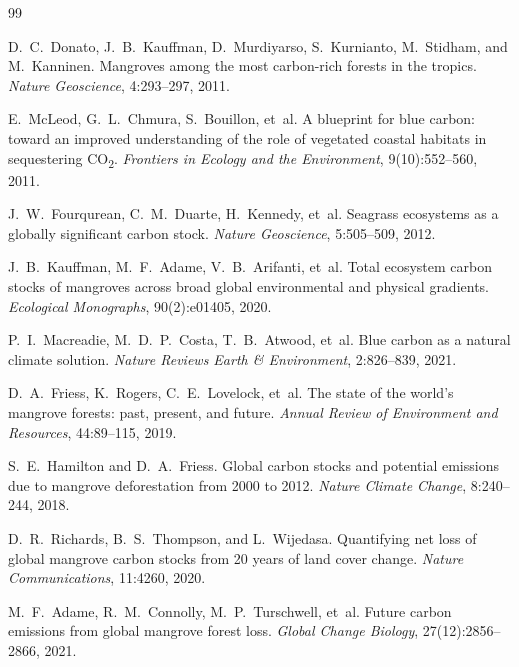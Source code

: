 \documentclass[twocolumn,9pt]{extarticle}
\begin{document}
\begin{thebibliography}{99}

D.~C.~Donato, J.~B.~Kauffman, D.~Murdiyarso, S.~Kurnianto, M.~Stidham, and M.~Kanninen.
\newblock Mangroves among the most carbon-rich forests in the tropics.
\newblock \emph{Nature Geoscience}, 4:293--297, 2011.

E.~McLeod, G.~L.~Chmura, S.~Bouillon, et~al.
\newblock A blueprint for blue carbon: toward an improved understanding of the role of vegetated coastal habitats in sequestering CO\textsubscript{2}.
\newblock \emph{Frontiers in Ecology and the Environment}, 9(10):552--560, 2011.

J.~W.~Fourqurean, C.~M.~Duarte, H.~Kennedy, et~al.
\newblock Seagrass ecosystems as a globally significant carbon stock.
\newblock \emph{Nature Geoscience}, 5:505--509, 2012.

J.~B.~Kauffman, M.~F.~Adame, V.~B.~Arifanti, et~al.
\newblock Total ecosystem carbon stocks of mangroves across broad global environmental and physical gradients.
\newblock \emph{Ecological Monographs}, 90(2):e01405, 2020.

P.~I.~Macreadie, M.~D.~P.~Costa, T.~B.~Atwood, et~al.
\newblock Blue carbon as a natural climate solution.
\newblock \emph{Nature Reviews Earth \& Environment}, 2:826--839, 2021.

D.~A.~Friess, K.~Rogers, C.~E.~Lovelock, et~al.
\newblock The state of the world's mangrove forests: past, present, and future.
\newblock \emph{Annual Review of Environment and Resources}, 44:89--115, 2019.

S.~E.~Hamilton and D.~A.~Friess.
\newblock Global carbon stocks and potential emissions due to mangrove deforestation from 2000 to 2012.
\newblock \emph{Nature Climate Change}, 8:240--244, 2018.

D.~R.~Richards, B.~S.~Thompson, and L.~Wijedasa.
\newblock Quantifying net loss of global mangrove carbon stocks from 20 years of land cover change.
\newblock \emph{Nature Communications}, 11:4260, 2020.

M.~F.~Adame, R.~M.~Connolly, M.~P.~Turschwell, et~al.
\newblock Future carbon emissions from global mangrove forest loss.
\newblock \emph{Global Change Biology}, 27(12):2856--2866, 2021.


\end{thebibliography}
\end{document}
